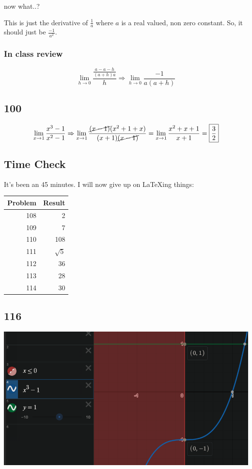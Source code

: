 \documentclass[letterpaper]{article}
\begin{document}
now what..?

This is just the derivative of \(\frac{1}{a}\) where \(a\) is a real
valued, non zero constant. So, it should just be
\(\boxed{\frac{-1}{a^2}}\).

\subsubsection{In class review}
\label{sec:orgdbfc331}
\[\lim_{h\to 0}\frac{\frac{a-a-h}{(a+h)a}}{h} \Rightarrow \lim_{h\to 0}\frac{-1}{a(a+h)}\]

\subsection{100}
\label{sec:org159c239}
\[
\lim_{x\to1}\frac{x^3-1}{x^2-1} \Rightarrow \lim_{x\to 1}\frac{\cancel{(x-1)}(x^2+1+x)}{(x+1)\cancel{(x-1)}} = \lim_{x\to 1}\frac{x^2+x+1}{x+1} = \boxed{\frac{3}{2}}
\]

\subsection{Time Check}
\label{sec:org3cdfbe1}
It's been an 45 minutes. I will now give up on LaTeXing things:

\begin{center}
\begin{tabular}{rr}
Problem & Result\\
\hline
108 & 2\\
109 & 7\\
110 & 108\\
111 & \(\sqrt{5}\)\\
112 & 36\\
113 & 28\\
114 & 30\\
\end{tabular}
\end{center}

\subsection{116}
\label{sec:orge889347}
\begin{center}
\includegraphics[width=.9\linewidth]{KBe20math401src1u4p116graph.png}
\end{center}
\end{document}
